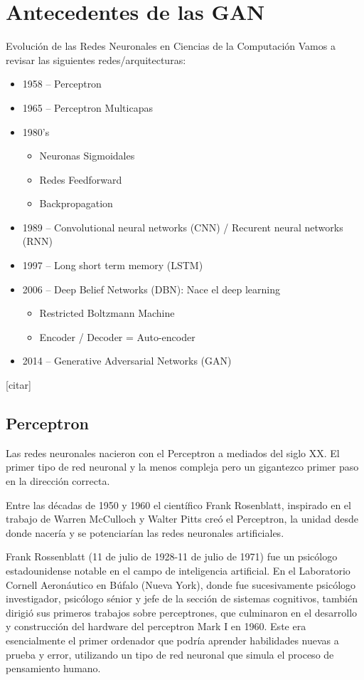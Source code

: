\documentclass[a4paper]{article}
\begin{document}
\section{Antecedentes de las GAN}
Evolución de las Redes Neuronales en Ciencias de la Computación
Vamos a revisar las siguientes redes/arquitecturas:
\begin{itemize}

    \item{1958 – Perceptron}
    \item{1965 – Perceptron Multicapas}
    \item{1980’s
    	\begin{itemize}
    	\item{Neuronas Sigmoidales}
        \item{Redes Feedforward}
        \item{Backpropagation}
        \end{itemize}
        }
    \item{1989 – Convolutional neural networks (CNN) / Recurent neural networks (RNN)}
    \item{1997 – Long short term memory (LSTM)}
    \item{2006 – Deep Belief Networks (DBN): Nace el deep learning}
    \begin{itemize}
    
        \item{Restricted Boltzmann Machine}
        \item{Encoder / Decoder = Auto-encoder}
        
    \end{itemize}
    \item{2014 – Generative Adversarial Networks (GAN)}

\end{itemize}[citar]


\subsection{Perceptron}
Las redes neuronales nacieron con el Perceptron a mediados del siglo XX. El primer tipo de red 
neuronal y la menos compleja pero un gigantezco primer paso en la dirección correcta.

Entre las décadas de 1950 y 1960 el científico Frank Rosenblatt, inspirado en el trabajo de 
Warren McCulloch y Walter Pitts creó el Perceptron, la unidad desde donde nacería y se 
potenciarían las redes neuronales artificiales.

Frank Rossenblatt (11 de julio de 1928-11 de julio de 1971) fue un psicólogo estadounidense 
notable en el campo de inteligencia artificial. En el Laboratorio Cornell Aeronáutico en 
Búfalo (Nueva York), donde fue sucesivamente psicólogo investigador, psicólogo
sénior y jefe de la sección de sistemas cognitivos, también dirigió sus primeros trabajos 
sobre perceptrones, que culminaron en el desarrollo y construcción del hardware del perceptron 
Mark I en 1960. Este era esencialmente el primer ordenador que podría aprender habilidades 
nuevas a prueba y error, utilizando un tipo de red neuronal que simula el proceso de 
pensamiento humano. 
\end{document}
